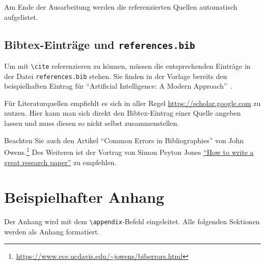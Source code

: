 \documentclass{hhuarticle}
\theoremstyle{definition}
\theoremstyle{theorem}
\begin{document}
  Am Ende der Ausarbeitung werden die referenzierten Quellen automatisch
  aufgelistet.

  \subsection{Bibtex-Einträge und \texttt{references.bib}}

  Um mit \texttt{\textbackslash cite} referenzieren zu können,
  müssen die entsprechenden Einträge in der Datei \texttt{references.bib}
  stehen.
  Sie finden in der Vorlage bereits den beispielhaften Eintrag für
  ``Artificial Intelligence: A Modern Approach''~\cite{russell2002artificial}.

  Für Literaturquellen empfiehlt es sich in aller Regel
  \url{https://scholar.google.com} zu nutzen.
  Hier kann man sich direkt den Bibtex-Eintrag einer Quelle
  angeben lassen und muss diesen so nicht selbst zusammenstellen.

  Beachten Sie auch den Artikel
  ``Common Errors in Bibliographies''
  von John Owens.\footnote{%
    \url{https://www.ece.ucdavis.edu/~jowens/biberrors.html}}
  Des Weiteren ist der Vortrag von Simon Peyton Jones \href{https://www.microsoft.com/en-us/research/academic-program/write-great-research-paper/}{``How to write a great research paper''} zu empfehlen.

  \appendix
  \section{Beispielhafter Anhang}
  Der Anhang wird mit dem \texttt{\textbackslash{}appendix}-Befehl eingeleitet.
  Alle folgenden Sektionen werden als Anhang formatiert.

\backmatter
\listoffigures
\listoftables


\end{document}
